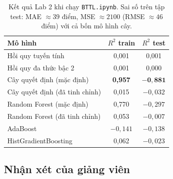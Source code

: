 
\begin{table}[H]
\centering
\begin{tabular}{|l|c|c|}
\hline
\textbf{Mô hình} & \textbf{$R^2$ train} & \textbf{$R^2$ test} \\
\hline
Hồi quy tuyến tính & 0,001 & 0,001 \\ \hline
Hồi quy đa thức bậc 2 & 0,001 & 0,000 \\ \hline
Cây quyết định (mặc định) & \textbf{0,957} & $\mathbf{-0{,}881}$ \\ \hline
Cây quyết định (đã tinh chỉnh) & 0,015 & $-0{,}032$ \\ \hline
Random Forest (mặc định) & 0,770 & $-0{,}297$ \\ \hline
Random Forest (đã tinh chỉnh) & 0,053 & $-0{,}007$ \\ \hline
AdaBoost & $-0{,}141$ & $-0{,}138$ \\ \hline
HistGradientBoosting & 0,062 & $-0{,}023$ \\ \hline
\end{tabular}
\caption{Kết quả Lab 2 khi chạy \texttt{BTTL.ipynb}. Sai số trên tập test: MAE $\approx 39$ điểm, MSE $\approx 2100$ (RMSE $\approx 46$ điểm) với cả bốn mô hình cây.}
\label{tab:lab-bank-r2}
\end{table}

\subsection{Nhận xét của giảng viên}

